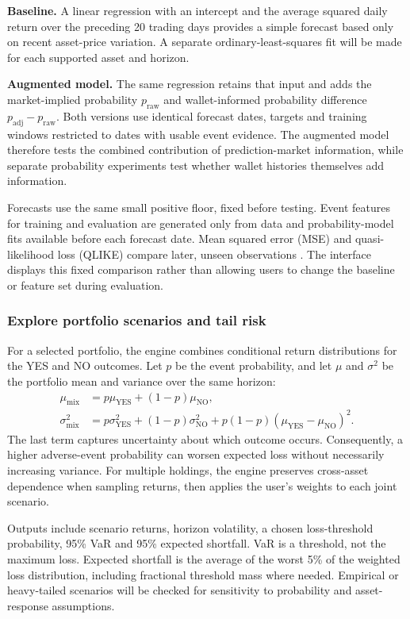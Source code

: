 \textbf{Baseline.} A linear regression with an intercept and the average squared daily return over the preceding 20 trading days provides a simple forecast based only on recent asset-price variation. A separate ordinary-least-squares fit will be made for each supported asset and horizon.

\textbf{Augmented model.} The same regression retains that input and adds the market-implied probability $p_{\text{raw}}$ and wallet-informed probability difference $p_{\text{adj}}-p_{\text{raw}}$. Both versions use identical forecast dates, targets and training windows restricted to dates with usable event evidence. The augmented model therefore tests the combined contribution of prediction-market information, while separate probability experiments test whether wallet histories themselves add information.

Forecasts use the same small positive floor, fixed before testing. Event features for training and evaluation are generated only from data and probability-model fits available before each forecast date. Mean squared error (MSE) and quasi-likelihood loss (QLIKE) compare later, unseen observations \cite{patton}. The interface displays this fixed comparison rather than allowing users to change the baseline or feature set during evaluation.

\subsubsection{Explore portfolio scenarios and tail risk}
For a selected portfolio, the engine combines conditional return distributions for the YES and NO outcomes. Let $p$ be the event probability, and let $\mu$ and $\sigma^2$ be the portfolio mean and variance over the same horizon:
\begin{align}
\mu_{\mathrm{mix}} &= p\mu_{\mathrm{YES}}+(1-p)\mu_{\mathrm{NO}}, \\
\sigma^2_{\mathrm{mix}} &= p\sigma^2_{\mathrm{YES}}+(1-p)\sigma^2_{\mathrm{NO}}
 +p(1-p)(\mu_{\mathrm{YES}}-\mu_{\mathrm{NO}})^2.
\end{align}
The last term captures uncertainty about which outcome occurs. Consequently, a higher adverse-event probability can worsen expected loss without necessarily increasing variance. For multiple holdings, the engine preserves cross-asset dependence when sampling returns, then applies the user's weights to each joint scenario.

Outputs include scenario returns, horizon volatility, a chosen loss-threshold probability, 95\% VaR and 95\% expected shortfall. VaR is a threshold, not the maximum loss. Expected shortfall is the average of the worst 5\% of the weighted loss distribution, including fractional threshold mass where needed. Empirical or heavy-tailed scenarios will be checked for sensitivity to probability and asset-response assumptions.
